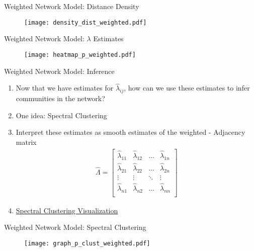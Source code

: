 \documentclass[handout]{beamer}
\begin{document}
\begin{frame}{Weighted Network Model: Distance Density}
\begin{figure}
    \centering
    \texttt{[image: density\_dist\_weighted.pdf]}
\end{figure}
\end{frame}

\begin{frame}{Weighted Network Model: $\lambda$ Estimates}
\begin{figure}
    \centering
    \texttt{[image: heatmap\_p\_weighted.pdf]}
\end{figure}
\end{frame}

\begin{frame}{Weighted Network Model: Inference}
\begin{enumerate}
\item Now that we have estimates for $\hat{\lambda}_{ij}$, how can we use these estimates to infer communities in the network? 
\item One idea: Spectral Clustering\pause
\item Interpret these estimates as smooth estimates of the weighted - Adjacency matrix 
\begin{align*}
\widehat{\Lambda} = \begin{bmatrix}
\hat{\lambda}_{11} & \hat{\lambda}_{12} & \dots & \hat{\lambda}_{1n}\\
\hat{\lambda}_{21} & \hat{\lambda}_{22} & \dots & \hat{\lambda}_{2n}\\
\vdots & \vdots & \ddots & \vdots\\
\hat{\lambda}_{n1} & \hat{\lambda}_{n2} & \dots & \hat{\lambda}_{nn}\\
\end{bmatrix}
\end{align*}
\item \href{https://plot.ly/~kkung/11}{Spectral Clustering Visualization}
\end{enumerate}
\end{frame}


\begin{frame}{Weighted Network Model: Spectral Clustering}
\begin{figure}
    \centering
    \texttt{[image: graph\_p\_clust\_weighted.pdf]}
\end{figure}
\end{frame}
\end{document}
